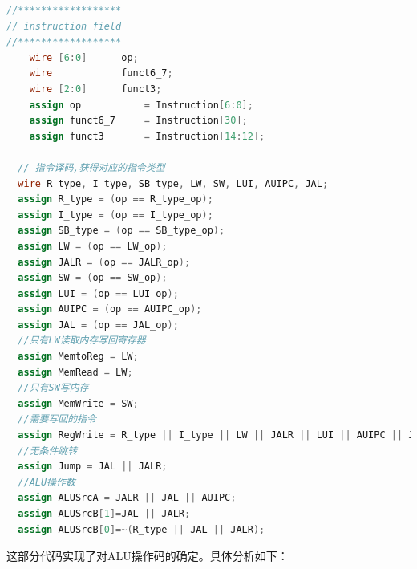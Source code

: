 \documentclass[12pt,hyperref,a4paper,UTF8]{ctexart}
\begin{document}
\begin{lstlisting}[language=Verilog,caption=信号设置]
//******************
// instruction field
//******************
	wire [6:0]		op;
	wire  	 	    funct6_7;
	wire [2:0]		funct3;
	assign op			= Instruction[6:0];
	assign funct6_7		= Instruction[30];
 	assign funct3		= Instruction[14:12];
	
  // 指令译码,获得对应的指令类型
  wire R_type, I_type, SB_type, LW, SW, LUI, AUIPC, JAL;
  assign R_type = (op == R_type_op);
  assign I_type = (op == I_type_op);
  assign SB_type = (op == SB_type_op);
  assign LW = (op == LW_op);
  assign JALR = (op == JALR_op);
  assign SW = (op == SW_op);
  assign LUI = (op == LUI_op);
  assign AUIPC = (op == AUIPC_op);
  assign JAL = (op == JAL_op);
  //只有LW读取内存写回寄存器
  assign MemtoReg = LW;
  assign MemRead = LW;
  //只有SW写内存
  assign MemWrite = SW;
  //需要写回的指令
  assign RegWrite = R_type || I_type || LW || JALR || LUI || AUIPC || JAL;
  //无条件跳转
  assign Jump = JAL || JALR;
  //ALU操作数
  assign ALUSrcA = JALR || JAL || AUIPC;
  assign ALUSrcB[1]=JAL || JALR;
  assign ALUSrcB[0]=~(R_type || JAL || JALR);
\end{lstlisting}


这部分代码实现了对ALU操作码的确定。具体分析如下：
\end{document}
